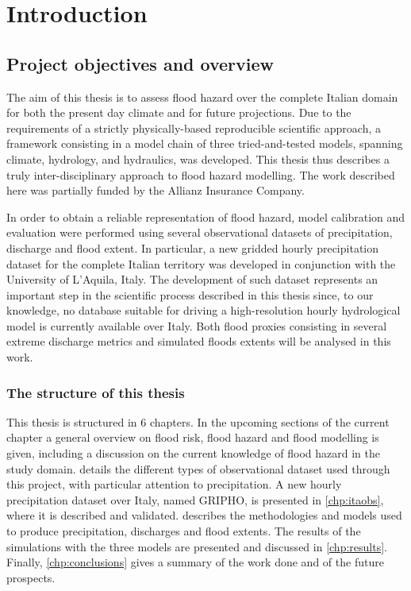 \chapter{Introduction}

\section{Project objectives and overview}
The aim of this thesis is to assess flood hazard over the complete Italian domain for both the present day climate and for future projections. Due to the requirements of a strictly physically-based reproducible scientific approach, a framework consisting in a model chain of three tried-and-tested models, spanning climate, hydrology, and hydraulics, was developed. This thesis thus describes a truly inter-disciplinary approach to flood hazard modelling. The work described here was partially funded by the Allianz Insurance Company.

In order to obtain a reliable representation of flood hazard, model calibration and evaluation were performed using several observational datasets of precipitation, discharge and flood extent. In particular, a new gridded hourly precipitation dataset for the complete Italian territory was developed in conjunction with the University of L'Aquila, Italy. The development of such dataset represents an important step in the scientific process described in this thesis since, to our knowledge, no database suitable for driving a high-resolution hourly hydrological model is currently available over Italy. Both flood proxies consisting in several extreme discharge metrics and simulated floods extents will be analysed in this work.

\subsection{The structure of this thesis}
This thesis is structured in 6 chapters.
In the upcoming sections of the current chapter a general overview on flood risk, flood hazard and flood modelling is given, including a discussion on the current knowledge of flood hazard in the study domain.
 details the different types of observational dataset used through this project, with particular attention to precipitation.
A new hourly precipitation dataset over Italy, named GRIPHO, is presented in \cref{chp:itaobs}, where it is described and validated.
 describes the methodologies and models used to produce precipitation, discharges and flood extents.
The results of the simulations with the three models are presented and discussed in \cref{chp:results}.
Finally, \cref{chp:conclusions} gives a summary of the work done and of the future prospects.

